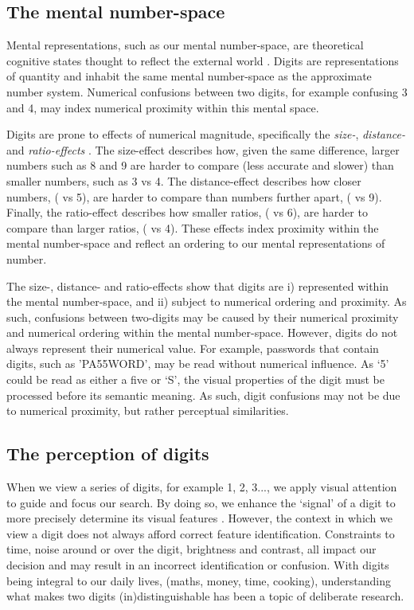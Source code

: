 \subsection{The mental number-space}
Mental representations, such as our mental number-space, are theoretical cognitive states thought to reflect the external world \cite{mueller2012alphabetic, eidels2016mental}. Digits are representations of quantity and inhabit the same mental number-space as the approximate number system. Numerical confusions between two digits, for example confusing 3 and 4, may index numerical proximity within this mental space.

Digits are prone to effects of numerical magnitude, specifically the \textit{size-}, \textit{distance-} and \textit{ratio-effects} \cite{dehaene2011NumSense}. The size-effect describes how, given the same difference, larger numbers such as 8 and 9 are harder to compare (less accurate and slower) than smaller numbers, such as 3 vs 4. The distance-effect describes how closer numbers, ( vs 5), are harder to compare than numbers further apart, ( vs 9). Finally, the ratio-effect describes how smaller ratios, ( vs 6), are harder to compare than larger ratios, ( vs 4). These effects index proximity within the mental number-space and reflect an ordering to our mental representations of number. 

The size-, distance- and ratio-effects show that digits are i) represented within the mental number-space, and ii) subject to numerical ordering and proximity. As such, confusions between two-digits may be caused by their numerical proximity and numerical ordering within the mental number-space. However, digits do not always represent their numerical value. For example, passwords that contain digits, such as 'PA55WORD', may be read without numerical influence. As `5' could be read as either a five or `S', the visual properties of the digit must be processed before its semantic meaning. As such, digit confusions may not be due to numerical proximity, but rather perceptual similarities.

\subsection{The perception of digits}
When we view a series of digits, for example 1, 2, 3..., we apply visual attention to guide and focus our search. By doing so, we enhance the `signal' of a digit to more precisely determine its visual features \cite{wolfe2004attributes}. However, the context in which we view a digit does not always afford correct feature identification. Constraints to time, noise around or over the digit, brightness and contrast, all impact our decision and may result in an incorrect identification or confusion. With digits being integral to our daily lives, (\eg maths, money, time, cooking), understanding what makes two digits (in)distinguishable has been a topic of deliberate research. 

